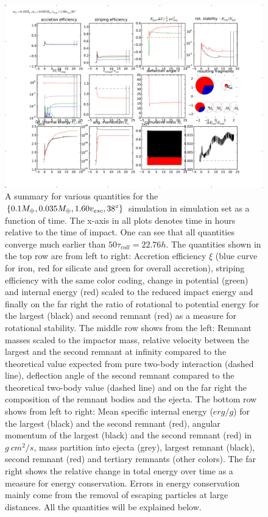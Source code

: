 \begin{figure}
\begin{center}
\includegraphics[scale=0.6]{31_sim_summary.pdf}
\caption{A summary for various quantities for the $\{0.1 M_{\oplus}, 0.035 M_{\oplus}, 1.60 v_{esc}, 38 ^\circ \}$ simulation in simulation set \css as a function of time. The x-axis in all plots denotes time in hours relative to the time of impact. One can see that all quantities converge much earlier than $50 \tau_{coll} = 22.76h$. The quantities shown in the top row are from left to right: Accretion efficiency $\xi$ (blue curve for iron, red for silicate and green for overall accretion), striping efficiency with the same color coding, change in potential (green) and internal energy (red) scaled to the reduced impact energy and finally on the far right the ratio of rotational to potential energy for the largest (black) and second remnant (red) as a measure for rotational stability. The middle row shows from the left: Remnant masses scaled to the impactor mass, relative velocity between the largest and the second remnant at infinity compared to the theoretical value expected from pure two-body interaction (dashed line), deflection angle of the second remnant compared to the theoretical two-body value (dashed line) and on the far right the composition of the remnant bodies and the ejecta. The bottom row shows from left to right: Mean specific internal energy ($erg/g$) for the largest (black) and the second remnant (red), angular momentum of the largest (black) and the second remnant (red) in $g~cm^2 / s$, mass partition into ejecta (grey), largest remnant (black), second remnant (red) and tertiary remnants (other colors). The far right shows the relative change in total energy over time as a measure for energy conservation. Errors in energy conservation mainly come from the removal of escaping particles at large distances. All the quantities will be explained below.}
\label{ch03_fig31}
\end{center}
\end{figure}
